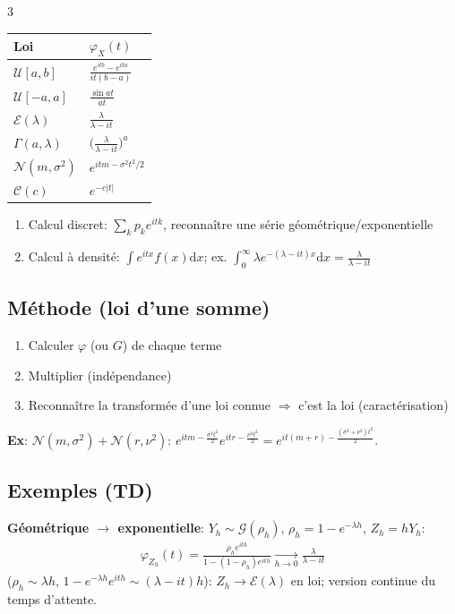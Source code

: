 \documentclass[12pt, a4paper]{article}
\newcommand{\dd}{\mathrm{d}}
\begin{document}
\begin{multicols*}{3}
	\begin{tabular}{|l|l|}
		\hline
		\textbf{Loi}             & $\varphi_X(t)$                                \\
		\hline
		$\mathcal U[a,b]$        & $\frac{e^{itb}-e^{ita}}{it(b-a)}$             \\
		$\mathcal U[-a,a]$       & $\frac{\sin at}{at}$                          \\
		$\mathcal E(\lambda)$    & $\frac{\lambda}{\lambda-it}$                  \\
		$\Gamma(a,\lambda)$      & $\big(\frac{\lambda}{\lambda-it}\big)^a$      \\
		$\mathcal N(m,\sigma^2)$ & $e^{itm-\sigma^2t^2/2}$                       \\
		$\mathcal C(c)$          & $e^{-c|t|}$                                   \\
		\hline
	\end{tabular}
	\begin{enumerate}[\roman*.]
		\item Calcul discret: $\sum_kp_ke^{itk}$, reconnaître une série géométrique/exponentielle
		\item Calcul à densité: $\int e^{itx}f(x)\dd x$; ex. $\int_0^\infty\lambda e^{-(\lambda-it)x}\dd x=\frac\lambda{\lambda-it}$
	\end{enumerate}

	\subsection{Méthode (loi d'une somme)}
	\begin{enumerate}[\roman*.]
		\item Calculer $\varphi$ (ou $G$) de chaque terme
		\item Multiplier (indépendance)
		\item Reconnaître la transformée d'une loi connue $\Rightarrow$ c'est la loi (caractérisation)
	\end{enumerate}
	\textbf{Ex}: $\mathcal N(m,\sigma^2)+\mathcal N(r,\nu^2)$: $e^{itm-\frac{\sigma^2t^2}2}e^{itr-\frac{\nu^2t^2}2}=e^{it(m+r)-\frac{(\sigma^2+\nu^2)t^2}2}$.

	\colbreak
	\subsection{Exemples (TD)}
	\textbf{Géométrique $\to$ exponentielle}: $Y_h\sim\mathcal G(\rho_h)$, $\rho_h=1-e^{-\lambda h}$, $Z_h=hY_h$:
	\begin{gather*}
		\varphi_{Z_h}(t)=\frac{\rho_he^{ith}}{1-(1-\rho_h)e^{ith}}\xrightarrow[h\to0]{}\frac{\lambda}{\lambda-it}
	\end{gather*}
	($\rho_h\sim\lambda h$, $1-e^{-\lambda h}e^{ith}\sim(\lambda-it)h$): $Z_h\to\mathcal E(\lambda)$ en loi; version continue du temps d'attente.


\end{multicols*}
\end{document}
